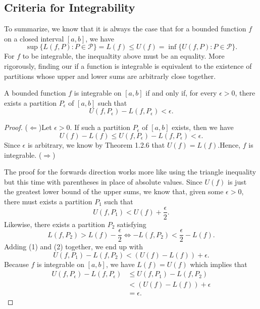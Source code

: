 \subsection{Criteria for Integrability} 

To summarize, we know that it is always the case that for a bounded function  \( f  \) on a closed interval \( [a,b]  \), we have 
\[  \sup \{ L(f,P) : P \in \mathcal{P} \} = L(f) \leq U(f) = \inf \{ U(f,P) : P \in \mathcal{P} \}.\] For \( f  \) to be integrable, the inequaltity above must be an equality. More rigorously, finding our if a function is integrable is equivalent to the existence of partitions whose upper and lower sums are arbitrarly close together.

\begin{tcolorbox}
	\begin{thm}
		A bounded function \(  f \) is integrable on \( [a,b]  \) if and only if, for every \( \epsilon > 0  \), there exists a partition \( P_{\epsilon } \) of \( [a,b] \) such that 
		\[  U(f, P_{\epsilon }) - L(f, P_{\epsilon }) < \epsilon. \]
	\end{thm}
\end{tcolorbox}

\begin{proof}
	(\( \Leftarrow \))Let \( \epsilon > 0  \). If such a partition \( P_{\epsilon } \) of \( [a,b]  \) exists, then we have
	\[ U(f) - L(f) \leq U(f, P_{\epsilon }) - L(f, P_{\epsilon }) < \epsilon. \]
	Since \( \epsilon  \) is arbitrary, we know by Theorem 1.2.6 that \( U(f) = L(f) \).Hence, \( f  \) is integrable.  
	(\( \Rightarrow \)) 

	The proof for the forwards direction works more like using the triangle inequality but this time with parentheses in place of absolute values. Since \( U(f)  \) is just the greatest lower bound of the upper sums, we know that, given some \( \epsilon > 0  \), there must exists a partition \( P_{1} \) such that 
	\[  U(f, P_{1}) < U(f) + \frac{ \epsilon  }{ 2 }. \tag{1} \]
	Likewise, there exists a partition \( P_{2}  \) satisfying 
	\[  L(f, P_{2}) > L(f) - \frac{ \epsilon  }{ 2 } \iff -L(f, P_{2}  ) < \frac{ \epsilon  }{ 2 } - L(f). \tag{2} \]
	Adding (1) and (2) together, we end up with 
	\[  U(f, P_{1}) - L(f, P_{2}) < ( U(f) - L(f)) + \epsilon.  \]
	Because \( f  \) is integrable on \( [a,b]  \), we have \( L(f) = U(f)  \) which implies that 
	\begin{align*}
	    U(f, P_{\epsilon }) - L(f, P_{\epsilon}) &\leq  U(f, P_{1}) - L(f, P_{2})  \\
												 &< (U(f) - L(f)) + \epsilon \\
												 &= \epsilon.
	\end{align*}
\end{proof}

